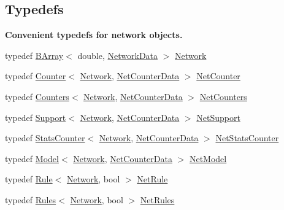 \subsection*{Typedefs}
\begin{Indent}\textbf{ Convenient typedefs for network objects.}\par
\begin{DoxyCompactItemize}
\item 
typedef \hyperlink{classbarry_1_1_b_array}{B\+Array}$<$ double, \hyperlink{classbarry_1_1counters_1_1network_1_1_network_data}{Network\+Data} $>$ \hyperlink{namespacebarry_1_1counters_1_1network_a440182967e1ba465e90a4b1d07e3a366}{Network}
\item 
typedef \hyperlink{classbarry_1_1_counter}{Counter}$<$ \hyperlink{namespacebarry_1_1counters_1_1network_a440182967e1ba465e90a4b1d07e3a366}{Network}, \hyperlink{classbarry_1_1counters_1_1network_1_1_net_counter_data}{Net\+Counter\+Data} $>$ \hyperlink{namespacebarry_1_1counters_1_1network_a067bd9de04608fc2e1586324d3864a45}{Net\+Counter}
\item 
typedef \hyperlink{classbarry_1_1_counters}{Counters}$<$ \hyperlink{namespacebarry_1_1counters_1_1network_a440182967e1ba465e90a4b1d07e3a366}{Network}, \hyperlink{classbarry_1_1counters_1_1network_1_1_net_counter_data}{Net\+Counter\+Data} $>$ \hyperlink{namespacebarry_1_1counters_1_1network_aa72fdb34752ac24167a06ee196a8fff6}{Net\+Counters}
\item 
typedef \hyperlink{classbarry_1_1_support}{Support}$<$ \hyperlink{namespacebarry_1_1counters_1_1network_a440182967e1ba465e90a4b1d07e3a366}{Network}, \hyperlink{classbarry_1_1counters_1_1network_1_1_net_counter_data}{Net\+Counter\+Data} $>$ \hyperlink{namespacebarry_1_1counters_1_1network_a4d30be7f465efd7d218f0264f8386b32}{Net\+Support}
\item 
typedef \hyperlink{classbarry_1_1_stats_counter}{Stats\+Counter}$<$ \hyperlink{namespacebarry_1_1counters_1_1network_a440182967e1ba465e90a4b1d07e3a366}{Network}, \hyperlink{classbarry_1_1counters_1_1network_1_1_net_counter_data}{Net\+Counter\+Data} $>$ \hyperlink{namespacebarry_1_1counters_1_1network_ae26c399917113fe280b3f2859376b8b9}{Net\+Stats\+Counter}
\item 
typedef \hyperlink{classbarry_1_1_model}{Model}$<$ \hyperlink{namespacebarry_1_1counters_1_1network_a440182967e1ba465e90a4b1d07e3a366}{Network}, \hyperlink{classbarry_1_1counters_1_1network_1_1_net_counter_data}{Net\+Counter\+Data} $>$ \hyperlink{namespacebarry_1_1counters_1_1network_a3ab1ee0750d4a5b0f92253874e055358}{Net\+Model}
\item 
typedef \hyperlink{classbarry_1_1_rule}{Rule}$<$ \hyperlink{namespacebarry_1_1counters_1_1network_a440182967e1ba465e90a4b1d07e3a366}{Network}, bool $>$ \hyperlink{namespacebarry_1_1counters_1_1network_afbd2c2a61931e69dd5f668c421e87a6f}{Net\+Rule}
\item 
typedef \hyperlink{classbarry_1_1_rules}{Rules}$<$ \hyperlink{namespacebarry_1_1counters_1_1network_a440182967e1ba465e90a4b1d07e3a366}{Network}, bool $>$ \hyperlink{namespacebarry_1_1counters_1_1network_adbdb20b3ce883777da2364984ea10c56}{Net\+Rules}
\end{DoxyCompactItemize}
\end{Indent}

